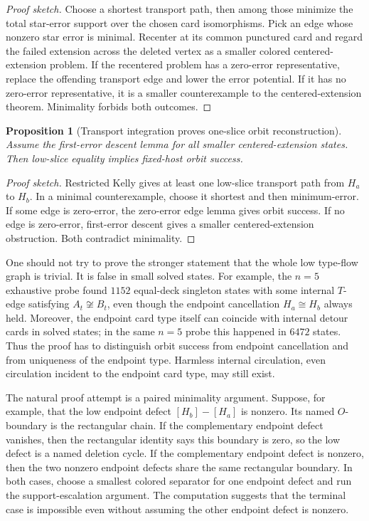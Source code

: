 \documentclass[11pt]{article}
\newtheorem{proposition}{Proposition}
\begin{document}
\begin{proof}[Proof sketch]
Choose a shortest transport path, then among those minimize the total
star-error support over the chosen card isomorphisms.  Pick an edge whose
nonzero star error is minimal.  Recenter at its common punctured card and
regard the failed extension across the deleted vertex as a smaller colored
centered-extension problem.  If the recentered problem has a zero-error
representative, replace the offending transport edge and lower the error
potential.  If it has no zero-error representative, it is a smaller
counterexample to the centered-extension theorem.  Minimality forbids both
outcomes.
\end{proof}

\begin{proposition}[Transport integration proves one-slice orbit reconstruction]
Assume the first-error descent lemma for all smaller centered-extension
states.  Then low-slice equality implies fixed-host orbit success.
\end{proposition}

\begin{proof}[Proof sketch]
Restricted Kelly gives at least one low-slice transport path from \(H_a\) to
\(H_b\).  In a minimal counterexample, choose it shortest and then
minimum-error.  If some edge is zero-error, the zero-error edge lemma gives
orbit success.  If no edge is zero-error, first-error descent gives a smaller
centered-extension obstruction.  Both contradict minimality.
\end{proof}

One should not try to prove the stronger statement that the whole low
type-flow graph is trivial.  It is false in small solved states.  For example,
the \(n=5\) exhaustive probe found \(1152\) equal-deck singleton states with
some internal \(T\)-edge satisfying \(A_t\not\cong B_t\), even though the
endpoint cancellation \(H_a\cong H_b\) always held.  Moreover, the endpoint
card type itself can coincide with internal detour cards in solved states; in
the same \(n=5\) probe this happened in \(6472\) states.  Thus the proof has to
distinguish orbit success from endpoint cancellation and from uniqueness of the
endpoint type.  Harmless internal circulation, even circulation incident to the
endpoint card type, may still exist.

The natural proof attempt is a paired minimality argument.  Suppose, for
example, that the low endpoint defect \([H_b]-[H_a]\) is nonzero.  Its named
\(O\)-boundary is the rectangular chain.  If the complementary endpoint defect
vanishes, then the rectangular identity says this boundary is zero, so the low
defect is a named deletion cycle.  If the complementary endpoint defect is
nonzero, then the two nonzero endpoint defects share the same rectangular
boundary.  In both cases, choose a smallest colored separator for one endpoint
defect and run the support-escalation argument.  The computation suggests
that the terminal case is impossible even without assuming the other endpoint
defect is nonzero.
\end{document}
